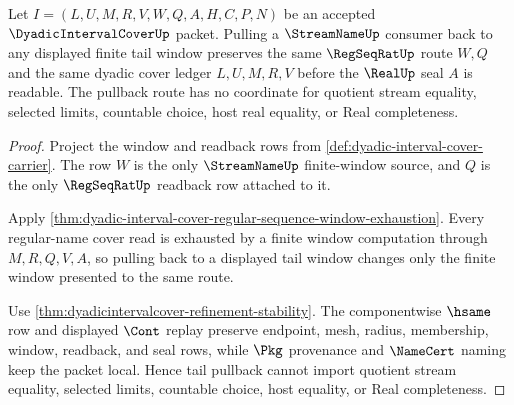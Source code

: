 \begin{theorem}
\label{thm:dyadic-interval-cover-tail-pullback-stability}
Let $I=(L,U,M,R,V,W,Q,A,H,C,P,N)$ be an accepted $\DyadicIntervalCoverUp$ packet. Pulling a $\StreamNameUp$ consumer back to any displayed finite tail window preserves the same $\RegSeqRatUp$ route $W,Q$ and the same dyadic cover ledger $L,U,M,R,V$ before the $\RealUp$ seal $A$ is readable. The pullback route has no coordinate for quotient stream equality, selected limits, countable choice, host real equality, or Real completeness.
\end{theorem}
\begin{proof}
Project the window and readback rows from \autoref{def:dyadic-interval-cover-carrier}. The row $W$ is the only $\StreamNameUp$ finite-window source, and $Q$ is the only $\RegSeqRatUp$ readback row attached to it.

Apply \autoref{thm:dyadic-interval-cover-regular-sequence-window-exhaustion}. Every regular-name cover read is exhausted by a finite window computation through $M,R,Q,V,A$, so pulling back to a displayed tail window changes only the finite window presented to the same route.

Use \autoref{thm:dyadicintervalcover-refinement-stability}. The componentwise $\hsame$ row and displayed $\Cont$ replay preserve endpoint, mesh, radius, membership, window, readback, and seal rows, while $\Pkg$ provenance and $\NameCert$ naming keep the packet local. Hence tail pullback cannot import quotient stream equality, selected limits, countable choice, host equality, or Real completeness.
\end{proof}

